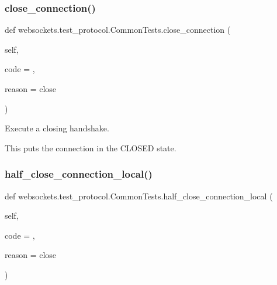 \subsubsection{\texorpdfstring{close\+\_\+connection()}{close\_connection()}}
{\footnotesize\ttfamily def websockets.\+test\+\_\+protocol.\+Common\+Tests.\+close\+\_\+connection (\begin{DoxyParamCaption}\item[{}]{self,  }\item[{}]{code = {},  }\item[{}]{reason = {\ttfamily \textquotesingle{}close\textquotesingle{}} }\end{DoxyParamCaption})}

\begin{DoxyVerb}Execute a closing handshake.

This puts the connection in the CLOSED state.\end{DoxyVerb}
 \mbox{\label{classwebsockets_1_1test__protocol_1_1_common_tests_aba585cd1108bd941cb1172825d4f5829}} 
\subsubsection{\texorpdfstring{half\+\_\+close\+\_\+connection\+\_\+local()}{half\_close\_connection\_local()}}
{\footnotesize\ttfamily def websockets.\+test\+\_\+protocol.\+Common\+Tests.\+half\+\_\+close\+\_\+connection\+\_\+local (\begin{DoxyParamCaption}\item[{}]{self,  }\item[{}]{code = {},  }\item[{}]{reason = {\ttfamily \textquotesingle{}close\textquotesingle{}} }\end{DoxyParamCaption})}

